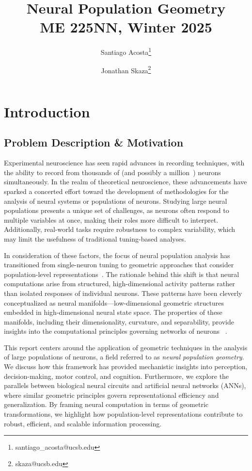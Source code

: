 \documentclass[11pt,a4paper]{article}
\author[1]{Santiago Acosta\thanks{santiago\_acosta@ucsb.edu}}
\author[1]{Jonathan Skaza\thanks{skaza@ucsb.edu}}
\affil[1]{Dynamical Neuroscience Graduate Program, University of California, Santa Barbara}
\title {Neural Population Geometry \\[1ex] \large ME 225NN, Winter 2025}
\date{}
\begin{document}
\maketitle
\section{Introduction}

\subsection{Problem Description \& Motivation}

Experimental neuroscience has seen rapid advances in recording techniques, with the ability to record from thousands of (and possibly a million~\cite{demas2021high}) neurons simultaneously. In the realm of theoretical neuroscience, these advancements have sparked a concerted effort toward the development of methodologies for the analysis of neural systems or populations of neurons. Studying large neural populations presents a unique set of challenges, as neurons often respond to multiple variables at once, making their roles more difficult to interpret. Additionally, real-world tasks require robustness to complex variability, which may limit the usefulness of traditional tuning-based analyses.

In consideration of these factors, the focus of neural population analysis has transitioned from single-neuron tuning to geometric approaches that consider population-level representations~\cite{yuste2015neuron, saxena2019towards}. The rationale behind this shift is that neural computations arise from structured, high-dimensional activity patterns rather than isolated responses of individual neurons. These patterns have been cleverly conceptualized as neural manifolds---low-dimensional geometric structures embedded in high-dimensional neural state space. The properties of these manifolds, including their dimensionality, curvature, and separability, provide insights into the computational principles governing networks of neurons ~\cite{chung2021neural}.

This report centers around the application of geometric techniques in the analysis of large populations of neurons, a field referred to as \textit{neural population geometry}. We discuss how this framework has provided mechanistic insights into perception, decision-making, motor control, and cognition. Furthermore, we explore the parallels between biological neural circuits and artificial neural networks (ANNs), where similar geometric principles govern representational efficiency and generalization. By framing neural computation in terms of geometric transformations, we highlight how population-level representations contribute to robust, efficient, and scalable information processing.
\end{document}
